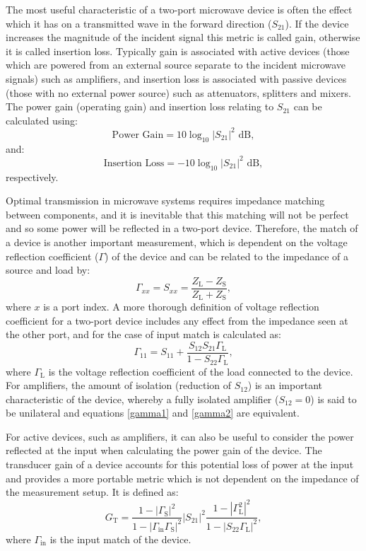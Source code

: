 \documentclass[../thesis/thesis.tex]{subfiles}
\begin{document}
The most useful characteristic of a two-port microwave device is often the effect which it has on a transmitted wave in the forward direction ($S_{21}$). If the device increases the magnitude of the incident signal this metric is called gain, otherwise it is called insertion loss. Typically gain is associated with active devices (those which are powered from an external source separate to the incident microwave signals) such as amplifiers, and insertion loss is associated with passive devices (those with no external power source) such as attenuators, splitters and mixers. The power gain (operating gain) and insertion loss relating to $S_{21}$ can be calculated using:
\begin{equation}
\textrm{Power Gain} = 10 \log_{10} |S_{21}|^2 \textrm{ dB},
\end{equation}
and:
\begin{equation}
\textrm{Insertion Loss} = -10 \log_{10} |S_{21}|^2 \textrm{ dB},
\end{equation}
respectively.

Optimal transmission in microwave systems requires impedance matching between components, and it is inevitable that this matching will not be perfect and so some power will be reflected in a two-port device. Therefore, the match of a device is another important measurement, which is dependent on the voltage reflection coefficient ($\Gamma$) of the device and can be related to the impedance of a source and load by:
\begin{equation}
\Gamma_{xx} = S_{xx} = \dfrac{Z_\textrm{L}-Z_\textrm{S}}{Z_\textrm{L}+Z_\textrm{S}},
\label{gamma1}
\end{equation}
where $x$ is a port index.
A more thorough definition of voltage reflection coefficient for a two-port device includes any effect from the impedance seen at the other port, and for the case of input match is calculated as:
\begin{equation}
\Gamma_{11} = S_{11} + \dfrac{S_{12}S_{21}\Gamma_\textrm{L}}
{1-S_{22}\Gamma_\textrm{L}},
\label{gamma2}
\end{equation}
where $\Gamma_\textrm{L}$ is the voltage reflection coefficient of the load connected to the device. For amplifiers, the amount of isolation (reduction of $S_{12}$) is an important characteristic of the device, whereby a fully isolated amplifier ($S_{12}=0$) is said to be unilateral and equations \ref{gamma1} and \ref{gamma2} are equivalent.

For active devices, such as amplifiers, it can also be useful to consider the power reflected at the input when calculating the power gain of the device. The transducer gain of a device accounts for this potential loss of power at the input and provides a more portable metric which is not dependent on the impedance of the measurement setup. It is defined as:
\begin{equation}
G_\textrm{T} = \dfrac{1-|\Gamma_\textrm{S}|^2}
{1-|\Gamma_\textrm{in}\Gamma_\textrm{S}|^2}
|S_{21}|^2
\dfrac{1-|\Gamma_\textrm{L}^2|^2}
{1-|S_{22}\Gamma_\textrm{L}|^2},
\end{equation}
where $\Gamma_\textrm{in}$ is the input match of the device.
\end{document}
